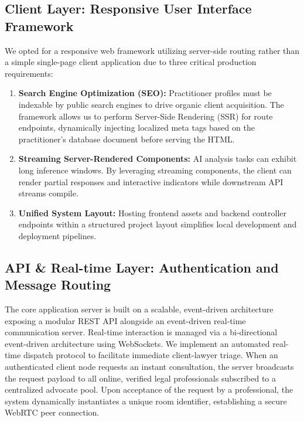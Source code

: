 \documentclass[conference]{IEEEtran}
\begin{document}
\subsection{Client Layer: Responsive User Interface Framework}
We opted for a responsive web framework utilizing server-side routing rather than a simple single-page client application due to three critical production requirements:
\begin{enumerate}[leftmargin=*]
  \item \textbf{Search Engine Optimization (SEO):} Practitioner profiles must be indexable by public search engines to drive organic client acquisition. The framework allows us to perform Server-Side Rendering (SSR) for route endpoints, dynamically injecting localized meta tags based on the practitioner's database document before serving the HTML.
  \item \textbf{Streaming Server-Rendered Components:} AI analysis tasks can exhibit long inference windows. By leveraging streaming components, the client can render partial responses and interactive indicators while downstream API streams compile.
  \item \textbf{Unified System Layout:} Hosting frontend assets and backend controller endpoints within a structured project layout simplifies local development and deployment pipelines.
\end{enumerate}

\subsection{API \& Real-time Layer: Authentication and Message Routing}
The core application server is built on a scalable, event-driven architecture exposing a modular REST API alongside an event-driven real-time communication server. Real-time interaction is managed via a bi-directional event-driven architecture using WebSockets. We implement an automated real-time dispatch protocol to facilitate immediate client-lawyer triage. When an authenticated client node requests an instant consultation, the server broadcasts the request payload to all online, verified legal professionals subscribed to a centralized advocate pool. Upon acceptance of the request by a professional, the system dynamically instantiates a unique room identifier, establishing a secure WebRTC peer connection.
\end{document}
